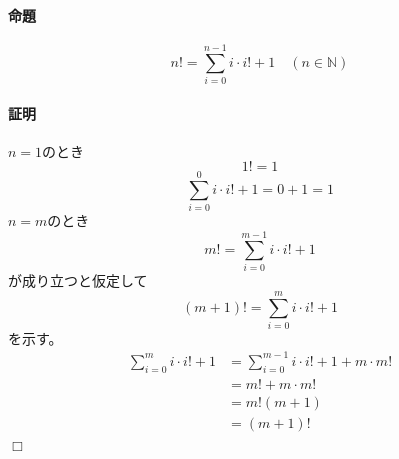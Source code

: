 \documentclass{jlreq}
\begin{document}
    \paragraph{命題}
    \[
        n!=\sum_{i=0}^{n-1}i\cdot i!+1 \quad (n\in \mathbb{N})
    \]
    \paragraph{証明}
    $n=1$のとき
    \[
        1!=1
    \]
    \[
        \sum_{i=0}^{0}i\cdot i!+1=0+1=1
    \]
    $n=m$のとき
    \[
        m!=\sum_{i=0}^{m-1}i\cdot i!+1
    \]
    が成り立つと仮定して
    \[
        (m+1)!=\sum_{i=0}^{m}i\cdot i!+1
    \]
    を示す。
    \begin{align*}
        \sum_{i=0}^{m}i\cdot i!+1&=\sum_{i=0}^{m-1}i\cdot i!+1+m\cdot m! \\
        &=m!+m\cdot m! \\
        &=m!(m+1) \\
        &=(m+1)!
    \end{align*}
    \hfill$\Box$
\end{document}
